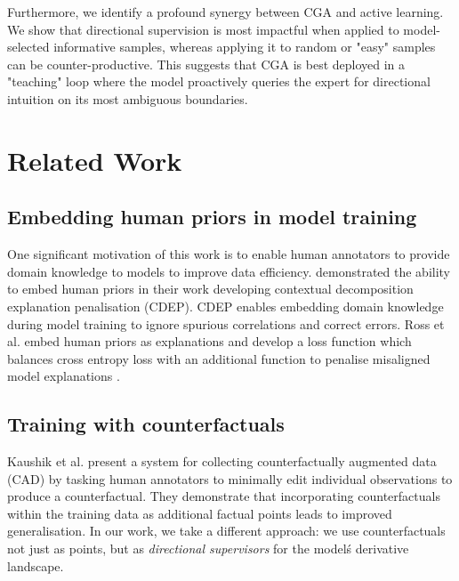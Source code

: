 \documentclass[sigconf,anonymous]{aamas}
\begin{document}
Furthermore, we identify a profound synergy between CGA and active learning. We show that directional supervision is most impactful when applied to model-selected informative samples, whereas applying it to random or "easy" samples can be counter-productive. This suggests that CGA is best deployed in a "teaching" loop where the model proactively queries the expert for directional intuition on its most ambiguous boundaries.

\section{Related Work}
\label{related_work}

\subsection{Embedding human priors in model training}
One significant motivation of this work is to enable human annotators to provide domain knowledge to models to improve data efficiency. \citeauthor{rieger2020interpretations} \cite{rieger2020interpretations} demonstrated the ability to embed human priors in their work developing contextual decomposition explanation penalisation (CDEP). CDEP enables embedding domain knowledge during model training to ignore spurious correlations and correct errors. Ross et al. embed human priors as explanations and develop a loss function which balances cross entropy loss with an additional function to penalise misaligned model explanations \cite{ross2017right}.

\subsection{Training with counterfactuals}
Kaushik et al. \cite{Kaushik2020Learning} present a system for collecting counterfactually augmented data (CAD) by tasking human annotators to minimally edit individual observations to produce a counterfactual. They demonstrate that incorporating counterfactuals within the training data as additional factual points leads to improved generalisation. In our work, we take a different approach: we use counterfactuals not just as points, but as \emph{directional supervisors} for the model\'s derivative landscape.
\end{document}
